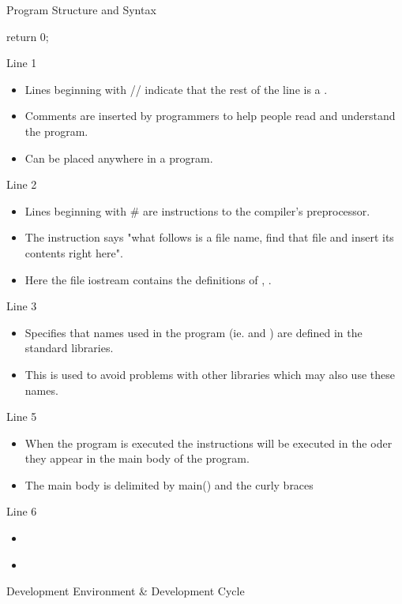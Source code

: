\documentclass[../lecture1-introduction.tex]{subfiles}
\begin{document}
\begin{frame}[fragile]{Program Structure and Syntax}
\begin{cppcode}
{            return 0;
        }
    \end{cppcode}
    {
        Line 1
        \begin{itemize}
            \item Lines beginning with // indicate that the rest of the line
            is a .
            \item Comments are inserted by programmers to help people read
            and understand the program.
            \item Can be placed anywhere in a program.
        \end{itemize}
    }
    {
        Line 2
        \begin{itemize}
            \item Lines beginning with \# are instructions to the compiler's
            preprocessor.
            \item The  instruction says "what follows is a file name,
            find that file and insert its contents right here".
            \item Here the file iostream contains the definitions of
            , .
        \end{itemize}
    }
    {
        Line 3
        \begin{itemize}
            \item Specifies that names used in the program (ie.  and
            ) are defined in the standard libraries.
            \item This is used to avoid problems with other libraries which may
            also use these names.
        \end{itemize}
    }
    {
        Line 5
        \begin{itemize}
            \item When the program is executed the instructions will be executed
            in the oder they appear in the main body of the program.
            \item The main body is delimited by main() and the curly braces
        \end{itemize}
    }
    {
        Line 6
        \begin{itemize}
            \item
        \end{itemize}
    }
    {
        \begin{itemize}
            \item
        \end{itemize}
    }
\end{frame}


\begin{frame}[fragile]{Development Environment \& Development Cycle}



\end{frame}

\end{document}
